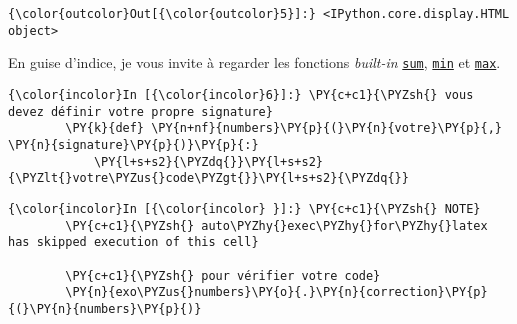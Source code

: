 \begin{Verbatim}[commandchars=\\\{\},frame=single,framerule=0.3mm,rulecolor=\color{cellframecolor}]
{\color{outcolor}Out[{\color{outcolor}5}]:} <IPython.core.display.HTML object>
\end{Verbatim}
            
    En guise d'indice, je vous invite à regarder les fonctions
\emph{built-in}
\href{https://docs.python.org/3/library/functions.html\#sum}{\texttt{sum}},
\href{https://docs.python.org/3/library/functions.html\#min}{\texttt{min}}
et
\href{https://docs.python.org/3/library/functions.html\#max}{\texttt{max}}.

    \begin{Verbatim}[commandchars=\\\{\},frame=single,framerule=0.3mm,rulecolor=\color{cellframecolor}]
{\color{incolor}In [{\color{incolor}6}]:} \PY{c+c1}{\PYZsh{} vous devez définir votre propre signature}
        \PY{k}{def} \PY{n+nf}{numbers}\PY{p}{(}\PY{n}{votre}\PY{p}{,} \PY{n}{signature}\PY{p}{)}\PY{p}{:}
            \PY{l+s+s2}{\PYZdq{}}\PY{l+s+s2}{\PYZlt{}votre\PYZus{}code\PYZgt{}}\PY{l+s+s2}{\PYZdq{}}
\end{Verbatim}


    \begin{Verbatim}[commandchars=\\\{\},frame=single,framerule=0.3mm,rulecolor=\color{cellframecolor}]
{\color{incolor}In [{\color{incolor} }]:} \PY{c+c1}{\PYZsh{} NOTE}
        \PY{c+c1}{\PYZsh{} auto\PYZhy{}exec\PYZhy{}for\PYZhy{}latex has skipped execution of this cell}
        
        \PY{c+c1}{\PYZsh{} pour vérifier votre code}
        \PY{n}{exo\PYZus{}numbers}\PY{o}{.}\PY{n}{correction}\PY{p}{(}\PY{n}{numbers}\PY{p}{)}
\end{Verbatim}



    
    
    
